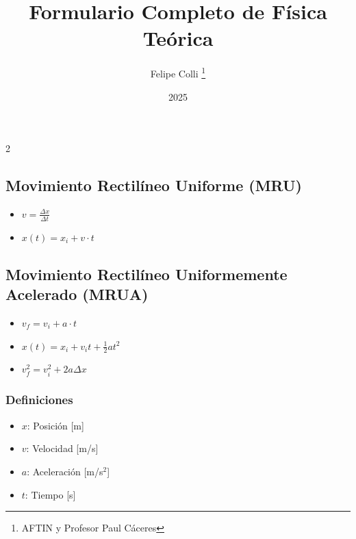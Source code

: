 \documentclass[11pt]{article}
\title{Formulario Completo de Física Teórica}
\author{Felipe Colli \thanks{AFTIN y Profesor Paul Cáceres}}
\date{2025}
\begin{document}
\maketitle
\thispagestyle{fancy} %

\begin{multicols}{2} %

\begin{tcolorbox}[title=Cinemática Lineal]
\subsection*{Movimiento Rectilíneo Uniforme (MRU)}
\begin{itemize}
    \item $v = \frac{\Delta x}{\Delta t}$
    \item $x(t) = x_i + v \cdot t$
\end{itemize}

\subsection*{Movimiento Rectilíneo Uniformemente Acelerado (MRUA)}
\begin{itemize}
    \item $v_f = v_i + a \cdot t$
    \item $x(t) = x_i + v_i t + \frac{1}{2}at^2$
    \item $v_f^2 = v_i^2 + 2a\Delta x$
\end{itemize}

\subsubsection*{Definiciones}
\begin{itemize}
    \item $x$: Posición [m]
    \item $v$: Velocidad [m/s]
    \item $a$: Aceleración [m/s$^2$]
    \item $t$: Tiempo [s]
\end{itemize}
\end{tcolorbox}


\begin{tcolorbox}[title=Movimiento Circular]

\end{tcolorbox}
\end{multicols}
\end{document}
